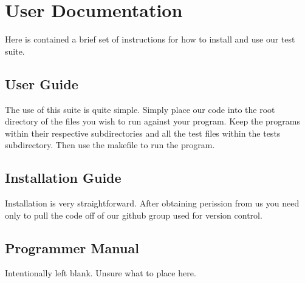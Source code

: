 
\chapter{User Documentation}

Here is contained a brief set of instructions for how to install and use our test suite.


\section{User Guide}
The use of this suite is quite simple. Simply place our code into the root directory of the files you wish to run against your program. Keep the programs within their respective subdirectories and all the test files within the tests subdirectory. Then use the makefile to run the program.


\section{Installation Guide}
Installation is very straightforward. After obtaining perission from us you need only to pull the code off of our github group used for version control.


\section{Programmer Manual}
Intentionally left blank. Unsure what to place here.
